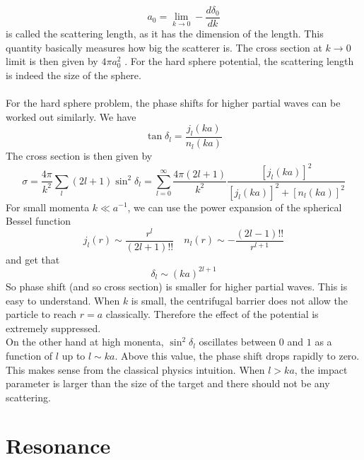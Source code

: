 \documentclass[cyan]{elegantnote}
\begin{document}
\[a_0 = \lim_{k \to 0} -\frac{d\delta_0}{dk}\]
is called the scattering length, as it has the dimension of the length. This quantity basically measures how big the scatterer is. The cross section at $k \to 0$ limit is then given by $4\pi a_0^2$ . For the hard sphere potential, the scattering length is indeed the size of the sphere.
\\ \\
For the hard sphere problem, the phase shifts for higher partial waves can be worked out similarly. We have
\[\tan\delta_l = \frac{j_l(ka)}{n_l(ka)}\]
The cross section is then given by
\[\sigma = \frac{4\pi}{k^2} \sum_l (2l+1) \sin^2\delta_l = \sum_{l=0}^{\infty} \frac{4\pi(2l+1)}{k^2} \frac{[j_l(ka)]^2}{[j_l(ka)]^2+[n_l(ka)]^2}\]
For small momenta $k \ll a^{-1}$, we can use the power expansion of the spherical Bessel function
\[j_l(r) \sim \frac{r^{l}}{(2l+1)!!} \quad n_l(r) \sim -\frac{(2l-1)!!}{r^{l+1}}\]
and get that
\[\delta_l \sim (ka)^{2l+1}\]
So phase shift (and so cross section) is smaller for higher partial waves. This is easy to understand. When $k$ is small, the centrifugal barrier does not allow the particle to reach $r=a$ classically. Therefore the effect of the potential is extremely suppressed.\\
On the other hand at high monenta, $\sin^2\delta_l$ oscillates between $0$ and $1$ as a function of $l$ up to $l \sim ka$. Above this value, the phase shift drops rapidly to zero. This makes sense from the classical physics intuition. When $l > ka$,
the impact parameter is larger than the size of the target and there should not be any scattering.

\section{Resonance}
\end{document}
